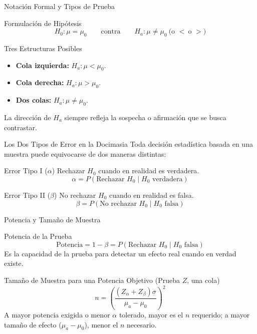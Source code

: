 \documentclass[10pt, aspectratio=169]{beamer}
\begin{document}
\begin{frame}{Notación Formal y Tipos de Prueba}
  \footnotesize
  \begin{block}{Formulación de Hipótesis}
    $$H_0: \mu = \mu_0 \qquad \text{contra} \qquad H_a: \mu \neq \mu_0 \ \text{(o } < \ \text{o } > \text{)}$$
  \end{block}
  \pause

  \vspace{0.1cm}
  \begin{alertblock}{Tres Estructuras Posibles}
    \begin{itemize}\itemsep=0.05cm
      \item \textbf{Cola izquierda:} $H_a: \mu < \mu_0$.
      \item \textbf{Cola derecha:} $H_a: \mu > \mu_0$.
      \item \textbf{Dos colas:} $H_a: \mu \neq \mu_0$.
    \end{itemize}
    La dirección de $H_a$ siempre refleja la sospecha o afirmación que se busca contrastar.
  \end{alertblock}
\end{frame}

\begin{frame}{Los Dos Tipos de Error en la Docimasia}
  \footnotesize
  Toda decisión estadística basada en una muestra puede equivocarse de dos maneras distintas: \pause

  \vspace{0.1cm}
  \begin{block}{Error Tipo I ($\alpha$)}
    Rechazar $H_0$ cuando en realidad es verdadera.
    $$\alpha = P(\text{Rechazar } H_0 \mid H_0 \text{ verdadera})$$
  \end{block}
  \pause

  \vspace{0.1cm}
  \begin{alertblock}{Error Tipo II ($\beta$)}
    No rechazar $H_0$ cuando en realidad es falsa.
    $$\beta = P(\text{No rechazar } H_0 \mid H_0 \text{ falsa})$$
  \end{alertblock}
\end{frame}

\begin{frame}{Potencia y Tamaño de Muestra}
  \footnotesize
  \begin{block}{Potencia de la Prueba}
    $$\text{Potencia} = 1-\beta = P(\text{Rechazar } H_0 \mid H_0 \text{ falsa})$$
    Es la capacidad de la prueba para detectar un efecto real cuando en verdad existe.
  \end{block}
  \pause

  \vspace{0.1cm}
  \begin{alertblock}{Tamaño de Muestra para una Potencia Objetivo (Prueba $Z$, una cola)}
    $$n = \left(\frac{(Z_\alpha+Z_\beta)\sigma}{\mu_a-\mu_0}\right)^2$$
    A mayor potencia exigida o menor $\alpha$ tolerado, mayor es el $n$ requerido; a mayor tamaño de efecto ($\mu_a-\mu_0$), menor el $n$ necesario.
  \end{alertblock}
\end{frame}
\end{document}
